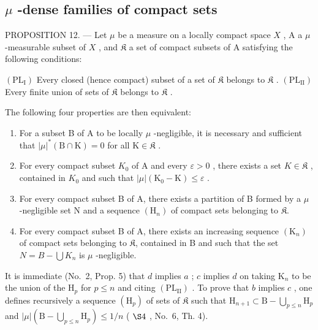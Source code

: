 \subsection{\texorpdfstring{\(\mu\) -dense families of compact sets}{mu -dense families of compact sets}}

PROPOSITION 12. --- Let \(\mu\) be a measure on a locally compact space \(X\) , A a \(\mu\) -measurable subset of \(X\) , and \(\mathfrak{K}\) a set of compact subsets of A satisfying the following conditions:

\((\mathrm{PL}_{\mathrm{I}})\) Every closed (hence compact) subset of a set of \(\mathfrak{K}\) belongs to \(\mathfrak{K}\) . \((\mathrm{PL}_{\mathrm{II}})\) Every finite union of sets of \(\mathfrak{K}\) belongs to \(\mathfrak{K}\) .

The following four properties are then equivalent:

\begin{enumerate}
\def\labelenumi{\alph{enumi})}
\item
  For a subset B of A to be locally \(\mu\) -negligible, it is necessary and sufficient that \(|\mu|^*(\mathrm{B} \cap \mathrm{K}) = 0\) for all \(\mathrm{K} \in \mathfrak{K}\) .
\item
  For every compact subset \(K_{0}\) of A and every \(\varepsilon > 0\) , there exists a set \(K \in \mathfrak{K}\) , contained in \(K_{0}\) and such that \(|\mu|(\mathrm{K}_{0} - \mathrm{K}) \leqslant \varepsilon\) .
\item
  For every compact subset B of A, there exists a partition of B formed by a \(\mu\) -negligible set N and a sequence \((\mathrm{H}_{n})\) of compact sets belonging to \(\mathfrak{K}\).
\item
  For every compact subset B of A, there exists an increasing sequence \((\mathrm{K}_{n})\) of compact sets belonging to \(\mathfrak{K}\), contained in B and such that the set \(N = B - \bigcup K_{n}\) is \(\mu\) -negligible.
\end{enumerate}

It is immediate (No.~2, Prop. 5) that \(d\) implies \(a\) ; \(c\) implies \(d\) on taking \(\mathrm{K}_n\) to be the union of the \(\mathrm{H}_p\) for \(p \leqslant n\) and citing \((\mathrm{PL}_{\mathrm{II}})\) . To prove that \(b\) implies \(c\) , one defines recursively a sequence \((\mathrm{H}_p)\) of sets of \(\mathfrak{K}\) such that \(\mathrm{H}_{n+1} \subset \mathrm{B} - \bigcup_{p \leqslant n} \mathrm{H}_p\) and \(|\mu| (\mathrm{B} - \bigcup_{p \leqslant n} \mathrm{H}_p) \leqslant 1/n\) ( \(\S 4\) , No.~6, Th. 4).

